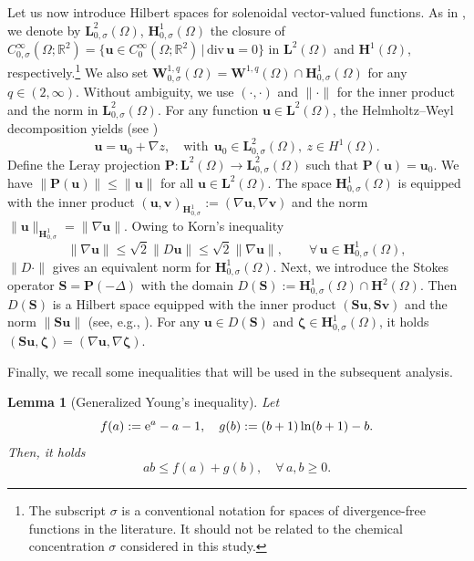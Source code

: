 \documentclass[11pt,reqno]{amsart}
\newtheorem{lemma}{\textbf{Lemma}}[section]
\def\be{\begin{equation}}
\def\ee{\end{equation}}
\begin{document}
Let us now introduce Hilbert spaces for solenoidal vector-valued functions. As in \cite{S}, we denote by $\bm{L}^2_{0,\sigma}(\Omega)$, $\bm{H}^1_{0,\sigma}(\Omega)$ the closure of $C_{0,\sigma}^{\infty}(\Omega;\mathbb{R}^2)=\big\{\bm{u}\in C_0^{\infty}(\Omega;\mathbb{R}^2)\,|\, \mathrm{div}\, \bm{u}=0\big\}$ in  $\bm{L}^2(\Omega)$ and $\bm{H}^1(\Omega)$,
respectively.\footnote{The subscript $\sigma$ is a conventional notation for spaces of divergence-free functions in the literature. It should not be related to the chemical concentration $\sigma$ considered in this study.} We also set $\bm{W}^{1,q}_{0,\sigma}(\Omega)=\bm{W}^{1,q}(\Omega)\cap \bm{H}^1_{0,\sigma}(\Omega)$ for any $q\in (2,\infty)$.
Without ambiguity, we use $(\cdot,\cdot)$ and $\|\cdot\|$ for the inner product and the norm in $\bm{L}^2_{0,\sigma}(\Omega)$. For any function $\bm{u} \in \bm{L}^2(\Omega)$, the Helmholtz--Weyl decomposition yields (see \cite[Chapter \uppercase\expandafter{}]{G})
\be
\bm{u}=\bm{u}_{0}+\nabla z,\quad\text{with}\ \ \bm{u}_{0} \in \bm{L}^2_{0,\sigma}(\Omega),\ z \in H^1(\Omega).\nonumber
\ee
Define the Leray projection $\bm{P}:\bm{L}^2(\Omega)\to \bm{L}^2_{0,\sigma}(\Omega)$ such that $\bm{P}(\bm{u})=\bm{u}_{0}$.
We have $\|\bm{P}(\bm{u})\|\leq \|\bm{u}\|$ for all $\bm{u}\in \bm{L}^2(\Omega)$.
%
The space $\bm{H}^1_{0,\sigma}(\Omega)$ is equipped with the inner product $(\bm{u},\bm{v})_{\bm{H}^1_{0,\sigma}}:=(\nabla \bm{u},\nabla \bm{v})$ and the norm $\|\bm{u}\|_{\bm{H}^1_{0,\sigma}}=\|\nabla \bm{u}\|$.
Owing to Korn's inequality
$$
\|\nabla \bm{u}\|\leq \sqrt{2}\|D\bm{u}\|
\leq \sqrt{2}\|\nabla \bm{u}\|,
\qquad \forall\, \bm{u}\in \bm{H}^1_{0,\sigma}(\Omega),
$$
$\|D\cdot\|$ gives an equivalent norm for $\bm{H}^1_{0,\sigma}(\Omega)$. Next, we introduce the Stokes operator $\bm{S}=\bm{P}(-\Delta)$ with the domain $D(\bm{S}):= \bm{H}^1_{0,\sigma}(\Omega)\cap\bm{H}^2(\Omega)$. Then $D(\bm{S})$ is a Hilbert space equipped with the inner product $(\bm{S}\bm{u},\bm{S}\bm{v})$ and the norm $\|\bm{S}\bm{u}\|$  (see, e.g., \cite[Chapter III]{S}). For any $\bm{u}\in D(\bm{S})$ and $\bm{\zeta} \in \bm{H}^1_{0,\sigma}(\Omega)$, it holds
$(\bm{S}\bm{u},\bm{\zeta})=(\nabla \bm{u},\nabla\bm{\zeta})$.

Finally, we recall some inequalities that will be used in the subsequent analysis.
%
\begin{lemma}[Generalized Young's inequality]
\label{You}
Let
\be
f(a):=\mathrm{e}^a-a-1, \quad g(b):=(b+1) \ln (b+1)-b.
\notag
\ee
Then, it holds
$$
a b \le f(a)+g(b), \quad \forall\, a, b \ge 0.
$$
\end{lemma}
%
\end{document}

